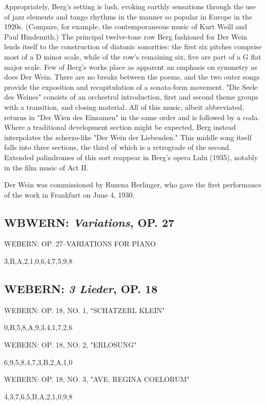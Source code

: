 		Appropriately, Berg's setting is lush, evoking earthly sensations through the use of jazz elements and tango rhythms in the manner so popular in Europe in the 1920s. (Compare, for example, the contemporaneous music of Kurt Weill and Paul Hindemith.) The principal twelve-tone row Berg fashioned for Der Wein lends itself to the construction of diatonic sonorities: the first six pitches comprise most of a D minor scale, while of the row's remaining six, five are part of a G flat major scale. Few of Berg's works place as apparent an emphasis on symmetry as does Der Wein. There are no breaks between the poems, and the two outer songs provide the exposition and recapitulation of a sonata-form movement. "Die Seele des Weines" consists of an orchestral introduction, first and second theme groups with a transition, and closing material. All of this music, albeit abbreviated, returns in "Der Wien des Einsamen" in the same order and is followed by a coda. Where a traditional development section might be expected, Berg instead interpolates the scherzo-like "Der Wein der Liebenden." This middle song itself falls into three sections, the third of which is a retrograde of the second. Extended palindromes of this sort reappear in Berg's opera Lulu (1935), notably in the film music of Act II.

		Der Wein was commissioned by Ruzena Herlinger, who gave the first performance of the work in Frankfurt on June 4, 1930.
		
		\subsection{WBWERN: \textit{Variations}, OP. 27}     
		
		WEBERN: OP. 27--VARIATIONS FOR PIANO
		
		{3,B,A,2,1,0,6,4,7,5,9,8}
		
		\subsection{WEBERN: \textit{3 Lieder}, OP. 18}
		
		WEBERN: OP. 18, NO. 1, "SCHATZERL KLEIN"
		
		{0,B,5,8,A,9,3,4,1,7,2,6}
		
		WEBERN: OP. 18, NO. 2, "ERLOSUNG"
		
		{6,9,5,8,4,7,3,B,2,A,1,0}
				
		WEBERN: OP. 18, NO. 3, "AVE, REGINA COELORUM"
		
		{4,3,7,6,5,B,A,2,1,0,9,8}	
		
